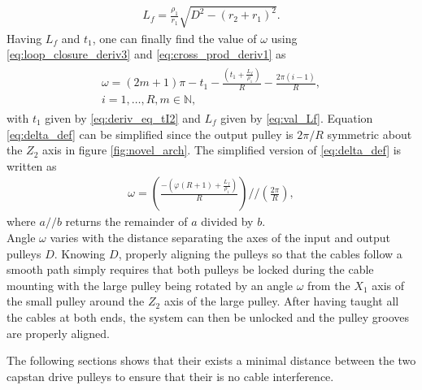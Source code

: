 \documentclass[10pt,cleanfoot]{asme2ej}
\begin{document}
\begin{align}
L_f = \frac{\rho_1}{r_1}\sqrt{D^2-(r_2+r_1)^2}.
\label{eq:val_Lf}
\end{align}
Having $L_f$ and $t_1$, one can finally find the value of $\omega$ using \eqref{eq:loop_closure_deriv3} and \eqref{eq:cross_prod_deriv1} as 
\begin{align}
\begin{multlined}
\omega = \left(2m+1\right)\pi-t_1-\frac{\left(t_1+\frac{L_f}{\rho_1}\right)}{R}-\frac{2\pi(i-1)}{R},\\ i=1 ,\ldots , R, m \in \mathbb{N},
\label{eq:delta_def}
\end{multlined}
\end{align}
with $t_1$ given by \eqref{eq:deriv_eq_tI2} and $L_f$ given by \eqref{eq:val_Lf}. Equation \eqref{eq:delta_def} can be simplified since the output pulley is $2\pi/R$ symmetric about the $Z_2$ axis in figure \ref{fig:novel_arch}. The simplified version of \eqref{eq:delta_def} is written as
\begin{align}
\omega = \left(\frac{-\left(\varphi\left(R+1\right)+\frac{L_f}{\rho_1}\right)}{R}\right)//\left(\frac{2\pi}{R}\right),
\end{align}
where $a//b$ returns the remainder of $a$ divided by $b$.\\

Angle $\omega$ varies with the distance separating the axes of the input and output pulleys $D$. Knowing $D$, properly aligning the pulleys so that the cables follow a smooth path simply requires that both pulleys be locked during the cable mounting with the large pulley being rotated by an angle $\omega$ from the $X_1$ axis of the small pulley around the $Z_2$ axis of the large pulley. After having taught all the cables at both ends, the system can then be unlocked and the pulley grooves are properly aligned.\par
The following sections shows that their exists a minimal distance between the two capstan drive pulleys to ensure that their is no cable interference.
\end{document}
